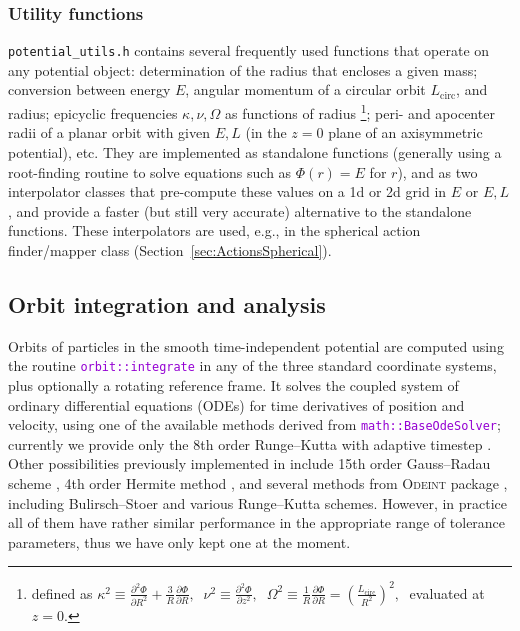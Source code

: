 \documentclass[12pt]{article}
\newcommand{\ttt}[1]{\textcolor{darkviolet}{\texttt{#1}}}
\renewcommand{\d}{\partial}
\begin{document}
\subsubsection{Utility functions}  \label{sec:PotentialUtility}

\texttt{potential_utils.h} contains several frequently used functions that operate on any potential object: determination of the radius that encloses a given mass; conversion between energy $E$, angular momentum of a circular orbit $L_\mathrm{circ}$, and radius; epicyclic frequencies $\kappa,\nu,\Omega$ as functions of radius%
\footnote{defined as $\displaystyle \kappa^2\equiv \frac{\d^2\Phi}{\d R^2} + \frac 3 R \frac{\d\Phi}{\d R},\;\; \nu^2\equiv \frac{\d^2\Phi}{\d z^2},\;\; \Omega^2\equiv \frac 1 R \frac{\d\Phi}{\d R} = \left(\frac{L_\mathrm{circ}}{R^2}\right)^2,\;$ evaluated at $z=0$.};
peri- and apocenter radii of a planar orbit with given $E,L$ (in the $z=0$ plane of an axisymmetric potential), etc. They are implemented as standalone functions (generally using a root-finding routine to solve equations such as $\Phi(r)=E$ for $r$), and as two interpolator classes that pre-compute these values on a 1d or 2d grid in $E$ or $E,L$, and provide a faster (but still very accurate) alternative to the standalone functions. These interpolators are used, e.g., in the spherical action finder/mapper class (Section~\ref{sec:ActionsSpherical}).


\subsection{Orbit integration and analysis}  \label{sec:Orbits}

Orbits of particles in the smooth time-independent potential are computed using the routine \ttt{orbit::integrate} in any of the three standard coordinate systems, plus optionally a rotating reference frame. It solves the coupled system of ordinary differential equations (ODEs) for time derivatives of position and velocity, using one of the available methods derived from \ttt{math::BaseOdeSolver}; currently we provide only the 8th order Runge--Kutta with adaptive timestep \cite{DOP853}. Other possibilities previously implemented in \cite{Vasiliev2013} include 15th order Gauss--Radau scheme \cite{IAS15}, 4th order Hermite method \cite{Hermite}, and several methods from \textsc{Odeint} package \cite{odeint}, including Bulirsch--Stoer and various Runge--Kutta schemes. However, in practice all of them have rather similar performance in the appropriate range of tolerance parameters, thus we have only kept one at the moment.
\end{document}
